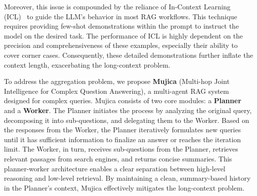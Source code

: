 Moreover, this issue is compounded by the reliance of In-Context Learning (ICL)~\cite{ICL} to guide the LLM's behavior in most RAG workflows. This technique requires providing few-shot demonstrations within the prompt to instruct the model on the desired task. The performance of ICL is highly dependent on the precision and comprehensiveness of these examples, especially their ability to cover corner cases. Consequently, these detailed demonstrations further inflate the context length, exacerbating the long-context problem.

To address the aggregation problem, we propose \textbf{Mujica} (Multi-hop Joint Intelligence for Complex Question Answering), a multi-agent RAG system designed for complex queries.
Mujica consists of two core modules: a \textbf{Planner} and a \textbf{Worker}.
The Planner initiates the process by analyzing the original query, decomposing it into sub-questions, and delegating them to the Worker.
Based on the responses from the Worker, the Planner iteratively formulates new queries until it has sufficient information to finalize an answer or reaches the iteration limit.
The Worker, in turn, receives sub-questions from the Planner, retrieves relevant passages from search engines, and returns concise summaries. This planner-worker architecture enables a clear separation between high-level reasoning and low-level retrieval.
By maintaining a clean, summary-based history in the Planner's context, Mujica effectively mitigates the long-context problem. 



